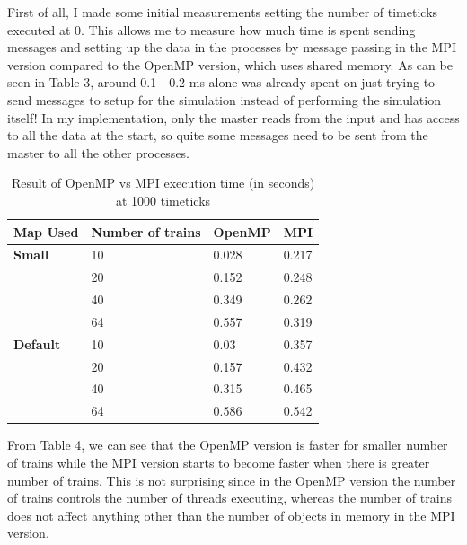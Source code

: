 \documentclass[12pt]{article}
\begin{document}
\bigbreak \noindent First of all, I made some initial measurements setting the number of timeticks executed at 0. This allows me to measure how much time is spent sending messages and setting up the data in the processes by message passing in the MPI version compared to the OpenMP version, which uses shared memory. As can be seen in Table 3, around 0.1 - 0.2 ms alone was already spent on just trying to send messages to setup for the simulation instead of performing the simulation itself! In my implementation, only the master reads from the input and has access to all the data at the start, so quite some messages need to be sent from the master to all the other processes.

\begin{table}[]
\begin{tabular}{|l|l|l|l|}
\hline
Map Used & Number of trains & OpenMP  & MPI                    \\ \hline
\textbf{Small}                & 10                & 0.028                & 0.217                    \\ \hline
                & 20                     & 0.152            & 0.248                    \\ \hline
                & 40                    & 0.349          & 0.262                    \\ \hline
                & 64                     & 0.557          & 0.319                     \\ \hline
\textbf{Default}                    & 10              & 0.03         & 0.357                     \\ \hline
                & 20            & 0.157            & 0.432                    \\ \hline
                & 40              & 0.315          & 0.465                    \\ \hline
                & 64              & 0.586          & 0.542                    \\ \hline
\end{tabular}
\caption{Result of OpenMP vs MPI execution time (in seconds) at 1000 timeticks}
\end{table}

\bigbreak \noindent From Table 4, we can see that the OpenMP version is faster for smaller number of trains while the MPI version starts to become faster when there is greater number of trains. This is not surprising since in the OpenMP version the number of trains controls the number of threads executing, whereas the number of trains does not affect anything other than the number of objects in memory in the MPI version.
\end{document}
